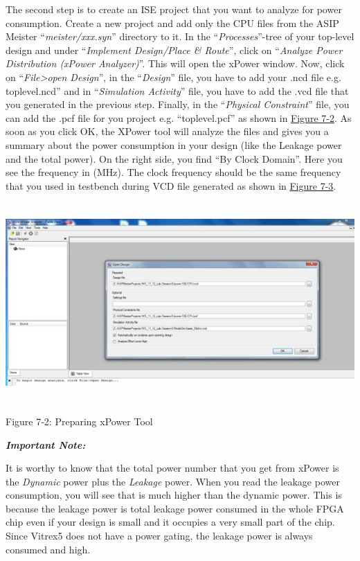 \documentclass[
]{article}
\begin{document}
The second step is to create an ISE project that you want to analyze for
power consumption. Create a new project and add only the CPU files from
the ASIP Meister ``\emph{meister/xxx.syn}'' directory to it. In the
``\emph{Processes}''-tree of your top-level design and under
``\emph{Implement Design/Place \& Route}'', click on ``\emph{Analyze
Power Distribution (xPower Analyzer)}''. This will open the xPower
window. Now, click on ``\emph{File\textgreater open Design}'', in the
``\emph{Design}'' file, you have to add your .ncd file e.g.
toplevel.ncd'' and in ``\emph{Simulation Activity}'' file, you have to
add the .vcd file that you generated in the previous step. Finally, in
the ``\emph{Physical Constraint}'' file, you can add the .pcf file for
you project e.g. ``toplevel.pcf'' as shown in
\protect\hyperlink{Fig72}{Figure 7-2}. As soon as you click OK, the
XPower tool will analyze the files and gives you a summary about the
power consumption in your design (like the Leakage power and the total
power). On the right side, you find ``By Clock Domain''. Here you see
the frequency in (MHz). The clock frequency should be the same frequency
that you used in testbench during VCD file generated as shown in
\protect\hyperlink{Fig73}{Figure 7-3}.

\includegraphics[width=6.28333in,height=3in]{7-2.png}

Figure 7‑2:\protect\hypertarget{Fig72}{}{} Preparing xPower Tool

\emph{\textbf{Important Note:}}

It is worthy to know that the total power number that you get from
xPower is the \emph{Dynamic} power plus the \emph{Leakage} power. When
you read the leakage power consumption, you will see that is much higher
than the dynamic power. This is because the leakage power is total
leakage power consumed in the whole FPGA chip even if your design is
small and it occupies a very small part of the chip. Since Vitrex5 does
not have a power gating, the leakage power is always consumed and high.
\end{document}
